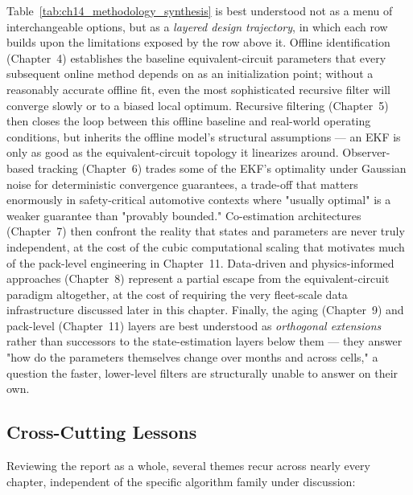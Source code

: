 Table~\ref{tab:ch14_methodology_synthesis} is best understood not as a menu of interchangeable options, but as a \emph{layered design trajectory}, in which each row builds upon the limitations exposed by the row above it. Offline identification (Chapter~4) establishes the baseline equivalent-circuit parameters that every subsequent online method depends on as an initialization point; without a reasonably accurate offline fit, even the most sophisticated recursive filter will converge slowly or to a biased local optimum. Recursive filtering (Chapter~5) then closes the loop between this offline baseline and real-world operating conditions, but inherits the offline model's structural assumptions — an EKF is only as good as the equivalent-circuit topology it linearizes around. Observer-based tracking (Chapter~6) trades some of the EKF's optimality under Gaussian noise for deterministic convergence guarantees, a trade-off that matters enormously in safety-critical automotive contexts where "usually optimal" is a weaker guarantee than "provably bounded." Co-estimation architectures (Chapter~7) then confront the reality that states and parameters are never truly independent, at the cost of the cubic computational scaling that motivates much of the pack-level engineering in Chapter~11. Data-driven and physics-informed approaches (Chapter~8) represent a partial escape from the equivalent-circuit paradigm altogether, at the cost of requiring the very fleet-scale data infrastructure discussed later in this chapter. Finally, the aging (Chapter~9) and pack-level (Chapter~11) layers are best understood as \emph{orthogonal extensions} rather than successors to the state-estimation layers below them — they answer "how do the parameters themselves change over months and across cells," a question the faster, lower-level filters are structurally unable to answer on their own.

\subsection{Cross-Cutting Lessons}
\label{subsec:14_cross_cutting}

Reviewing the report as a whole, several themes recur across nearly every chapter, independent of the specific algorithm family under discussion:


